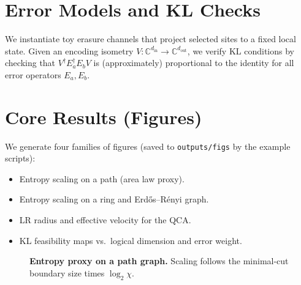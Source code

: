 \documentclass[11pt]{article}
\begin{document}
\section{Error Models and KL Checks}
We instantiate toy erasure channels that project selected sites to a fixed local state. Given an encoding isometry $V: \mathbb{C}^{d_\text{in}} \to \mathbb{C}^{d_\text{out}}$, we verify KL conditions by checking that $V^\dagger E_a^\dagger E_b V$ is (approximately) proportional to the identity for all error operators $E_a, E_b$.

\section{Core Results (Figures)}
We generate four families of figures (saved to \texttt{outputs/figs} by the example scripts):
\begin{itemize}
  \item Entropy scaling on a path (area law proxy).
  \item Entropy scaling on a ring and Erd\H{o}s--R\'enyi graph.
  \item LR radius and effective velocity for the QCA.
  \item KL feasibility maps vs.\ logical dimension and error weight.
\end{itemize}

\begin{figure}[ht]
  \centering
  \caption{\textbf{Entropy proxy on a path graph.} Scaling follows the minimal-cut boundary size times $\log_2 \chi$.}
  \label{fig:path}
\end{figure}
\end{document}
